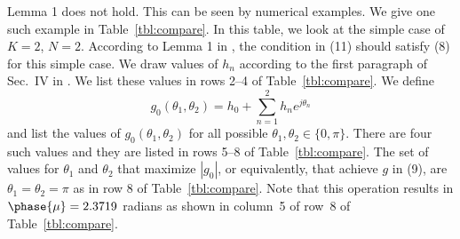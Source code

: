 \setcounter{equation}{18}
\begin{comment}
In fact,
\end{comment}
Lemma 1 does not hold. This can be seen by numerical examples. We give one such
example in Table~\ref{tbl:compare}. In this table, we look at the simple case of $K=2$, $N=2$.
According to Lemma 1 in \cite{b1}, the condition in (11) should satisfy (8) for this simple
case. We draw values of $h_n$ according to the first paragraph of Sec.~IV in \cite{b1}. We
list these values in rows 2--4 of Table~\ref{tbl:compare}. We define
\begin{equation}
g_0(\theta_1, \theta_2) = h_0 + \sum_{n=1}^2 h_n e^{j\theta_n}
\end{equation}
and list the values of $g_0(\theta_1,\theta_2)$ for all possible $\theta_1, \theta_2 \in \{0, \pi\}$.
There are four such values and they are listed in rows 5--8 of Table~\ref{tbl:compare}. The
set of values for $\theta_1$ and $\theta_2$ that maximize $|g_0|$, or equivalently, that
achieve $g$ in (9), are $\theta_1 = \theta_2 = \pi$ as in row 8 of Table~\ref{tbl:compare}.
Note that this operation results in $\phase{\mu}=2.3719$ radians as shown in column~5 of
row~8 of Table~\ref{tbl:compare}.

